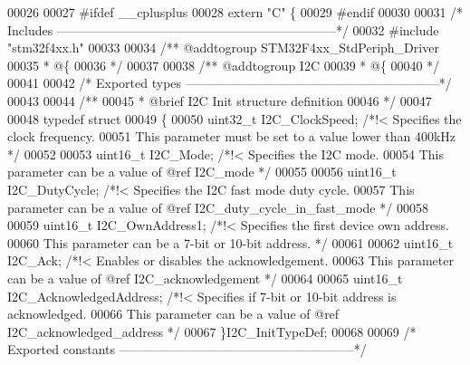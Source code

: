 \begin{DoxyCode}
00026 
00027 \textcolor{preprocessor}{#}\textcolor{preprocessor}{ifdef} \_\_cplusplus
00028  \textcolor{keyword}{extern} \textcolor{stringliteral}{"C"} \{
00029 \textcolor{preprocessor}{#}\textcolor{preprocessor}{endif}
00030 
00031 \textcolor{comment}{/* Includes ------------------------------------------------------------------*/}
00032 \textcolor{preprocessor}{#}\textcolor{preprocessor}{include} "stm32f4xx.h"
00033 
00034 \textcolor{comment}{/** @addtogroup STM32F4xx\_StdPeriph\_Driver}
00035 \textcolor{comment}{  * @\{}
00036 \textcolor{comment}{  */}
00037 
00038 \textcolor{comment}{/** @addtogroup I2C}
00039 \textcolor{comment}{  * @\{}
00040 \textcolor{comment}{  */}
00041 
00042 \textcolor{comment}{/* Exported types ------------------------------------------------------------*/}
00043 
00044 \textcolor{comment}{/** }
00045 \textcolor{comment}{  * @brief  I2C Init structure definition  }
00046 \textcolor{comment}{  */}
00047 
00048 \textcolor{keyword}{typedef} \textcolor{keyword}{struct}
00049 \{
00050   uint32\_t I2C_ClockSpeed;          \textcolor{comment}{/*!< Specifies the clock frequency.}
00051 \textcolor{comment}{                                         This parameter must be set to a value lower than 400kHz */}
00052 
00053   uint16\_t I2C_Mode;                \textcolor{comment}{/*!< Specifies the I2C mode.}
00054 \textcolor{comment}{                                         This parameter can be a value of @ref I2C\_mode */}
00055 
00056   uint16\_t I2C_DutyCycle;           \textcolor{comment}{/*!< Specifies the I2C fast mode duty cycle.}
00057 \textcolor{comment}{                                         This parameter can be a value of @ref
       I2C\_duty\_cycle\_in\_fast\_mode */}
00058 
00059   uint16\_t I2C_OwnAddress1;         \textcolor{comment}{/*!< Specifies the first device own address.}
00060 \textcolor{comment}{                                         This parameter can be a 7-bit or 10-bit address. */}
00061 
00062   uint16\_t I2C_Ack;                 \textcolor{comment}{/*!< Enables or disables the acknowledgement.}
00063 \textcolor{comment}{                                         This parameter can be a value of @ref I2C\_acknowledgement */}
00064 
00065   uint16\_t I2C_AcknowledgedAddress; \textcolor{comment}{/*!< Specifies if 7-bit or 10-bit address is acknowledged.}
00066 \textcolor{comment}{                                         This parameter can be a value of @ref
       I2C\_acknowledged\_address */}
00067 \}I2C\_InitTypeDef;
00068 
00069 \textcolor{comment}{/* Exported constants --------------------------------------------------------*/}

\end{DoxyCode}
